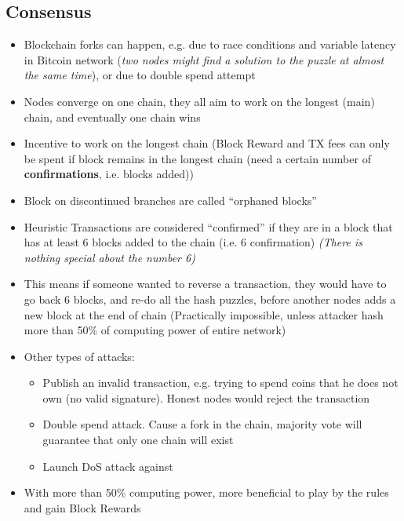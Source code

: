 \subsection{Consensus}
\begin{itemize}
	\item Blockchain forks can happen, e.g. due to race conditions and variable latency in Bitcoin network (\textit{two nodes might find a solution to the puzzle at almost the same time}), or due to double spend attempt
	\item Nodes converge on one chain, they all aim to work on the longest (main) chain, and eventually one chain wins
	\item Incentive to work on the longest chain (Block Reward and TX fees can only be spent if block remains in the longest chain (need a certain number of \textbf{confirmations}, i.e. blocks added))
	\item Block on discontinued branches are called ``orphaned blocks''
	\item Heuristic
	\subitem Transactions are considered ``confirmed'' if they are in a block that has at least 6 blocks added to the chain (i.e. 6 confirmation) \textit{(There is nothing special about the number 6)}
	\item This means if someone wanted to reverse a transaction, they would have to go back 6 blocks, and re-do all the hash puzzles, before another nodes adds a new block at the end of chain (Practically impossible, unless attacker hash more than 50\% of computing power of entire network)
	\item Other types of attacks:
	\begin{itemize}
		\item Publish an invalid transaction, e.g. trying to spend coins that he does not own (no valid signature). Honest nodes would reject the transaction
		\item Double spend attack. Cause a fork in the chain, majority vote will guarantee that only one chain will exist
		\item Launch DoS attack against
	\end{itemize}
	\item With more than 50\% computing power, more beneficial to play by the rules and gain Block Rewards
\end{itemize}